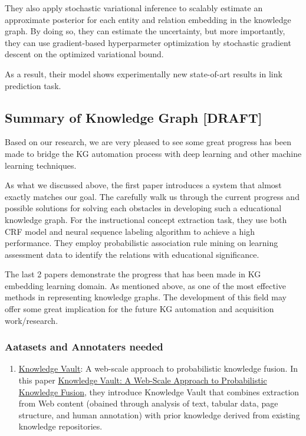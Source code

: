 \documentclass[]{book}
\providecommand{\tightlist}{%
  \setlength{\itemsep}{0pt}\setlength{\parskip}{0pt}}
\theoremstyle{definition}
\theoremstyle{definition}
\theoremstyle{definition}
\theoremstyle{remark}
\begin{document}
They also apply stochastic variational inference to scalably estimate an
approximate posterior for each entity and relation embedding in the
knowledge graph. By doing so, they can estimate the uncertainty, but
more importantly, they can use gradient-based hyperparmeter optimization
by stochastic gradient descent on the optimized variational bound.

As a result, their model shows experimentally new state-of-art results
in link prediction task.

\subsection{Summary of Knowledge Graph
{[}DRAFT{]}}\label{summary-of-knowledge-graph-draft}

Based on our research, we are very pleased to see some great progress
has been made to bridge the KG automation process with deep learning and
other machine learning techniques.

As what we discussed above, the first paper introduces a system that
almost exactly matches our goal. The carefully walk us through the
current progress and possible solutions for solving each obstacles in
developing such a educational knowledge graph. For the instructional
concept extraction task, they use both CRF model and neural sequence
labeling algorithm to achieve a high performance. They employ
probabilistic association rule mining on learning assessment data to
identify the relations with educational significance.

The last 2 papers demonstrate the progress that has been made in KG
embedding learning domain. As mentioned above, as one of the most
effective methods in representing knowledge graphs. The development of
this field may offer some great implication for the future KG automation
and acquisition work/research.

\subsubsection{Aatasets and Annotaters
needed}\label{aatasets-and-annotaters-needed}

\begin{enumerate}
\def\labelenumi{\arabic{enumi}.}
\tightlist
\item
  \href{https://ai.google/research/pubs/pub45634}{Knowledge Vault}: A
  web-scale approach to probabilistic knowledge fusion. In this paper
  \href{https://dejanseo.com.au/wp-content/uploads/2014/08/Knowledge-Vault-A-Web-Scale-Approach-to-Probabilistic-Knowledge-Fusion.pdf}{Knowledge
  Vault: A Web-Scale Approach to Probabilistic Knowledge Fusion}, they
  introduce Knowledge Vault that combines extraction from Web content
  (obained through analysis of text, tabular data, page structure, and
  human annotation) with prior knowledge derived from existing knowledge
  repositories.
\end{enumerate}
\end{document}
